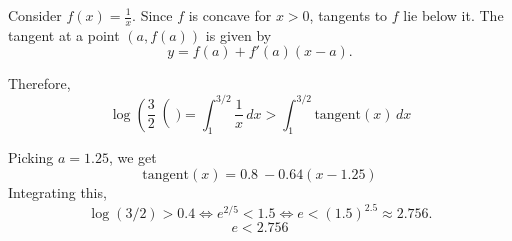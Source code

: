 \documentclass[11]{article}
\title{\sc{Elementary Lower Bound for $e$}}
\author{\sc{Rahul}}
\date{13 March, 2025}
\begin{document}
\maketitle
Consider $f(x) = \frac{1}x$. Since $f$ is concave for $x>0$, tangents to $f$ lie below it. The tangent at a point $(a, f(a))$ is given by $$y = f(a) + f'(a) (x-a).$$

Therefore, $$\log\left(\frac32\right() = \int_{1}^{3/2} \frac{1}{x}\,dx > \int_{1}^{3/2} \text{tangent}(x)\,dx$$

Picking $a=1.25$, we get $$\text{tangent}(x)=0.8\ -0.64\left(x-1.25\right)$$
Integrating this, $$\log(3/2) > 0.4 \iff e^{2/5} < 1.5 \iff e < (1.5)^{2.5} \approx 2.756.$$
$$\boxed{e<2.756}$$
\end{document}
